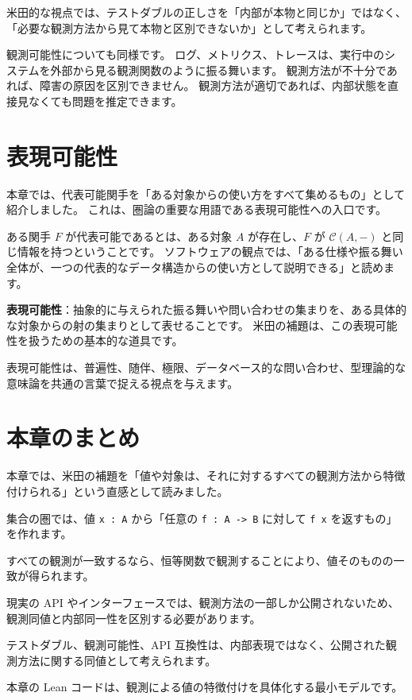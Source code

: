 米田的な視点では、テストダブルの正しさを「内部が本物と同じか」ではなく、「必要な観測方法から見て本物と区別できないか」として考えられます。

観測可能性についても同様です。
ログ、メトリクス、トレースは、実行中のシステムを外部から見る観測関数のように振る舞います。
観測方法が不十分であれば、障害の原因を区別できません。
観測方法が適切であれば、内部状態を直接見なくても問題を推定できます。

\section{表現可能性}

本章では、代表可能関手を「ある対象からの使い方をすべて集めるもの」として紹介しました。
これは、圏論の重要な用語である表現可能性への入口です。

ある関手 \(F\) が代表可能であるとは、ある対象 \(A\) が存在し、\(F\) が \(\mathcal{C}(A,-)\) と同じ情報を持つということです。
ソフトウェアの観点では、「ある仕様や振る舞い全体が、一つの代表的なデータ構造からの使い方として説明できる」と読めます。

\textbf{表現可能性}：抽象的に与えられた振る舞いや問い合わせの集まりを、ある具体的な対象からの射の集まりとして表せることです。
米田の補題は、この表現可能性を扱うための基本的な道具です。

表現可能性は、普遍性、随伴、極限、データベース的な問い合わせ、型理論的な意味論を共通の言葉で捉える視点を与えます。

\section{本章のまとめ}

本章では、米田の補題を「値や対象は、それに対するすべての観測方法から特徴付けられる」という直感として読みました。

集合の圏では、値 \texttt{x : A} から「任意の \texttt{f : A -> B} に対して \texttt{f x} を返すもの」を作れます。

すべての観測が一致するなら、恒等関数で観測することにより、値そのものの一致が得られます。

現実の API やインターフェースでは、観測方法の一部しか公開されないため、観測同値と内部同一性を区別する必要があります。

テストダブル、観測可能性、API 互換性は、内部表現ではなく、公開された観測方法に関する同値として考えられます。

本章の Lean コードは、観測による値の特徴付けを具体化する最小モデルです。
